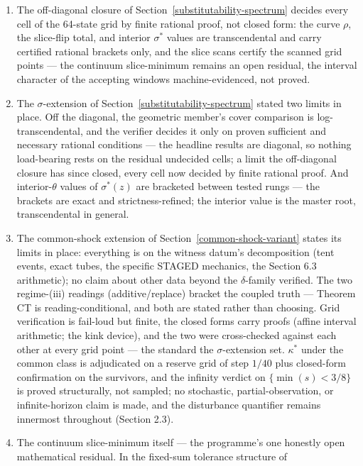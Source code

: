\documentclass[3p,11pt]{elsarticle}
\begin{document}
\begin{enumerate}
\item
  The off-diagonal closure of Section~\ref{substitutability-spectrum}
  decides every cell of the 64-state grid by finite rational proof,
  not closed form: the curve \(\rho\), the slice-flip total, and
  interior \(\sigma^*\) values are transcendental and carry
  certified rational brackets only, and the slice scans certify the
  scanned grid points --- the continuum slice-minimum remains an
  open residual, the interval character of the accepting windows
  machine-evidenced, not proved.
\item
  The \(\sigma\)-extension of Section~\ref{substitutability-spectrum}
  stated two limits in place. Off the diagonal, the geometric
  member's cover comparison is log-transcendental, and the
  verifier decides it only on proven sufficient and necessary
  rational conditions --- the headline results are diagonal, so
  nothing load-bearing rests on the residual undecided cells;
  a limit the off-diagonal closure has since closed, every cell
  now decided by finite rational proof. And interior-\(\theta\)
  values of \(\sigma^*(z)\) are bracketed between tested rungs
  --- the brackets are exact and strictness-refined; the interior
  value is the master root, transcendental in general.
\item
  The common-shock extension of Section~\ref{common-shock-variant}
  states its limits in place: everything is on the witness datum's
  decomposition (tent events, exact tubes,
  the specific STAGED mechanics, the Section 6.3 arithmetic);
  no claim about other data
  beyond the \(\delta\)-family verified. The two regime-(iii)
  readings (additive/replace) bracket the coupled truth ---
  Theorem CT is reading-conditional, and both are
  stated rather than choosing. Grid verification is
  fail-loud but finite, the closed forms carry proofs
  (affine interval arithmetic; the kink device), and the two
  were cross-checked against each other at every grid point
  --- the standard the \(\sigma\)-extension set. \(\kappa^*\)
  under the common class is adjudicated on a reserve grid of
  step \(1/40\) plus closed-form confirmation on the survivors,
  and the infinity verdict on \(\{\min(s) < 3/8\}\) is
  proved structurally, not sampled; no stochastic,
  partial-observation, or infinite-horizon claim is made, and
  the disturbance quantifier remains innermost throughout
  (Section 2.3).
\item
  The continuum slice-minimum itself ---
  the programme's one honestly open mathematical residual. In
  the fixed-sum tolerance structure of

\end{enumerate}
\end{document}
